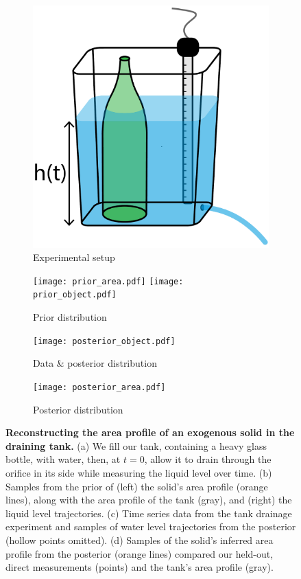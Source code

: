 \documentclass[a4paper,fleqn]{cas-dc}
\begin{document}
\begin{figure}[ht]
    \centering
        \begin{subfigure}[b]{0.2\textwidth}
    	\includegraphics[width=\textwidth]{tank_w_bottle.pdf}
	\caption{Experimental setup} \label{fig:tank_w_bottle}
    \end{subfigure}
     \begin{subfigure}[b]{0.8\textwidth}
    	\texttt{[image: prior\_area.pdf]}
	\texttt{[image: prior\_object.pdf]}
	\caption{Prior distribution} \label{fig:prior_area}
    \end{subfigure}
    
     \begin{subfigure}[b]{0.4\textwidth}
    	\texttt{[image: posterior\_object.pdf]}
	\caption{Data \& posterior distribution} \label{fig:posterior_object}
    \end{subfigure}
    \begin{subfigure}[b]{0.44\textwidth}
    	\texttt{[image: posterior\_area.pdf]}
	\caption{Posterior distribution} \label{fig:posterior_area}
    \end{subfigure}
    \caption{
      \textbf{Reconstructing the area profile of an exogenous solid in the draining tank.} 
      (a) We fill our tank, containing a heavy glass bottle, with water, then, at $t=0$, allow it to drain through the orifice in its side while measuring the liquid level over time.
      (b) Samples from the prior of (left) the solid's area profile (orange lines), along with the area profile of the tank (gray), and (right) the liquid level trajectories.
      (c) Time series data from the tank drainage experiment and samples of water level trajectories from the posterior (hollow points omitted).
      (d) Samples of the solid's inferred area profile from the posterior (orange lines) compared our held-out, direct measurements (points) and the tank's area profile (gray).
      }
\end{figure}
\end{document}
